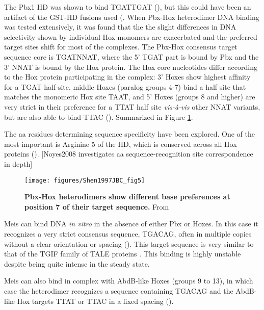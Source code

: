 The Pbx1 \ac{HD} was shown to bind TGATTGAT (\cite{VanDijk1993}), but this could have been an artifact of the GST-\ac{HD} fusions used (\cite{review que lo decia: Mann and chan 1996?}. When Pbx-Hox heterodimer DNA binding was tested extensively, it was found that the the slight differences in DNA selectivity shown by individual Hox monomers are exacerbated and the preferred target sites shift for most of the complexes. The Pbx-Hox consensus target sequence core is TGATNNAT, where the 5' TGAT part is bound by Pbx and the 3' NNAT is bound by the Hox protein. The Hox core nucleotides differ according to the Hox protein participating in the complex: 3' Hoxes show highest affinity for a TGAT half-site, middle Hoxes (paralog groups 4-7) bind a half site that matches the monomeric Hox site TAAT, and 5' Hoxes (groups 8 and higher) are very strict in their preference for a TTAT half site \textit{vis-à-vis} other NNAT variants, but are also able to bind TTAC (\cite{Chang1996,Chan1997,Shen1997a}). Summarized in Figure \ref{fig:Shen1997JBC_fig5}.

The \ac{aa} residues determining sequence specificity have been explored. One of the most important is Arginine 5 of the \ac{HD}, which is conserved across all Hox proteins (\cite{Phelan1997}). [Noyes2008 investigates aa sequence-recognition site correspondence in depth] 


\begin{figure}[]
  
  \centering
  \texttt{[image: figures/Shen1997JBC\_fig5]}
  \caption[Pbx-Hox heterodimers show different base preferences at position 7 of their target sequence]{\textbf{Pbx-Hox heterodimers show different base preferences at position 7 of their target sequence.} From \cite{Shen1997a}}
  \label{fig:Shen1997JBC_fig5}
\end{figure}

Meis can bind DNA \textit{in vitro} in the absence of either Pbx or Hoxes. In this case it recognizes a very strict consensus sequence, TGACAG, often in multiple copies without a clear orientation or spacing (\cite{Shen1997}). This target sequence is very similar to that of the TGIF family of TALE proteins \cite{ref}. This binding is highly unstable despite being quite  intense in the steady state. 

Meis can also bind in complex with AbdB-like Hoxes (groups 9 to 13), in which case the heterodimer recognizes a sequence containing TGACAG and the AbdB-like Hox targets TTAT or TTAC in a fixed spacing (\cite{Shen1997}). 

